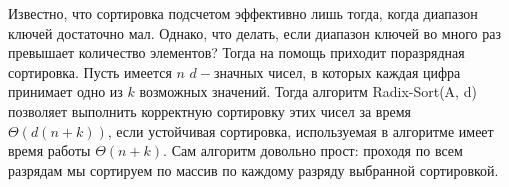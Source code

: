 \documentclass[12pt]{article}
\begin{document}
	Известно, что сортировка подсчетом эффективно лишь тогда, когда диапазон ключей достаточно мал. Однако, что делать, если диапазон ключей во много раз превышает количество элементов? Тогда на помощь приходит поразрядная сортировка. Пусть имеется $n$ $d-\textit{значных}$ чисел, в которых каждая цифра принимает одно из $k$ возможных значений. Тогда алгоритм Radix-Sort(A, d) позволяет выполнить корректную сортировку этих чисел за время $\Theta(d(n+k))$, если устойчивая сортировка, используемая в алгоритме имеет время работы $\Theta(n+k)$. Сам алгоритм довольно прост: проходя по всем разрядам мы сортируем по массив по каждому разряду выбранной сортировкой.
	
\end{document}
